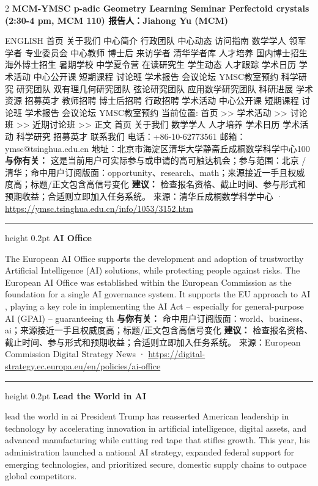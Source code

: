 \documentclass[10.5pt]{ctexart}
\begin{document}
\begin{multicols}{2}
{\large\bfseries MCM-YMSC p-adic Geometry Learning Seminar Perfectoid crystals (2:30-4 pm, MCM 110) 报告人：Jiahong Yu (MCM)}\par
ENGLISH 首页 关于我们 中心简介 行政团队 中心动态 访问指南 数学学人 领军学者 专业委员会 中心教师 博士后 来访学者 清华学者库 人才培养 国内博士招生 海外博士招生 暑期学校 中学夏令营 在读研究生 学生动态 人才跟踪 学术日历 学术活动 中心公开课 短期课程 讨论班 学术报告 会议论坛 YMSC教室预约 科学研究 研究团队 双有理几何研究团队 弦论研究团队 应用数学研究团队 科研进展 学术资源 招募英才 教师招聘 博士后招聘 行政招聘 学术活动 中心公开课 短期课程 讨论班 学术报告 会议论坛 YMSC教室预约 当前位置: 首页 >> 学术活动 >> 讨论班 >> 近期讨论班 >> 正文 首页 关于我们 数学学人 人才培养 学术日历 学术活动 科学研究 招募英才 联系我们 电话：+86-10-62773561 邮箱：ymsc@tsinghua.edu.cn 地址：北京市海淀区清华大学静斋丘成桐数学科学中心100
\textbf{与你有关：} 这是当前用户可实际参与或申请的高可触达机会；参与范围：北京 / 清华；命中用户订阅版面：opportunity、research、math；来源接近一手且权威度高；标题/正文包含高信号变化
\textbf{建议：} 检查报名资格、截止时间、参与形式和预期收益；合适则立即加入任务系统。
{\footnotesize\color{ormuted} 来源：清华丘成桐数学科学中心 · \url{https://ymsc.tsinghua.edu.cn/info/1053/3152.htm}}
\vspace{2mm}
\hrule height 0.2pt
\vspace{2mm}
{\large\bfseries AI Office}\par
The European AI Office supports the development and adoption of trustworthy Artificial Intelligence (AI) solutions, while protecting people against risks. The European AI Office was established within the European Commission as the foundation for a single AI governance system. It supports the EU approach to AI , playing a key role in implementing the AI Act – especially for general-purpose AI (GPAI) – guaranteeing th
\textbf{与你有关：} 命中用户订阅版面：world、business、ai；来源接近一手且权威度高；标题/正文包含高信号变化
\textbf{建议：} 检查报名资格、截止时间、参与形式和预期收益；合适则立即加入任务系统。
{\footnotesize\color{ormuted} 来源：European Commission Digital Strategy News · \url{https://digital-strategy.ec.europa.eu/en/policies/ai-office}}
\vspace{2mm}
\hrule height 0.2pt
\vspace{2mm}
{\large\bfseries Lead the World in AI}\par
lead the world in ai President Trump has reasserted American leadership in technology by accelerating innovation in artificial intelligence, digital assets, and advanced manufacturing while cutting red tape that stifles growth. This year, his administration launched a national AI strategy, expanded federal support for emerging technologies, and prioritized secure, domestic supply chains to outpace global competitors.

\end{multicols}
\end{document}

